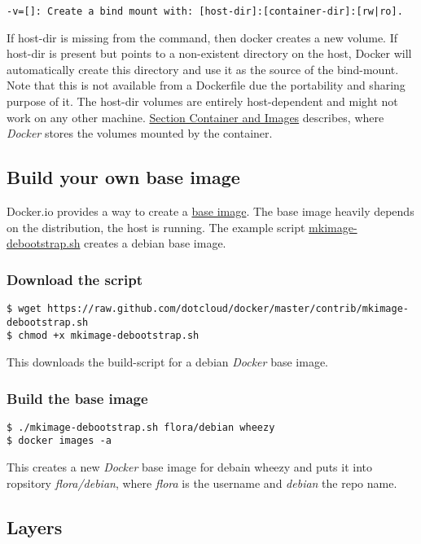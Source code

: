 \documentclass[11pt]{article}
\begin{document}
\begin{verbatim}
-v=[]: Create a bind mount with: [host-dir]:[container-dir]:[rw|ro].
\end{verbatim}
If host-dir is missing from the command, then docker creates a new volume. If host-dir is present but points to a non-existent directory on the host, Docker will automatically create this directory and use it as the source of the bind-mount.
Note that this is not available from a Dockerfile due the portability and sharing purpose of it. The host-dir volumes are entirely host-dependent and might not work on any other machine. \hyperref[sec-2-6]{Section Container and Images} describes, where \emph{Docker} stores the volumes mounted by the container.
\subsection{Build your own base image}
\label{sec-2-4}

Docker.io provides a way to create a \href{http://docs.docker.io/en/latest/articles/baseimages/}{base image}. The base image heavily depends on the distribution, the host is running. The example script \href{https://github.com/dotcloud/docker/blob/master/contrib/mkimage-debootstrap.sh}{mkimage-debootstrap.sh} creates a debian base image.
\subsubsection{Download the script}
\label{sec-2-4-1}


\begin{verbatim}
$ wget https://raw.github.com/dotcloud/docker/master/contrib/mkimage-debootstrap.sh
$ chmod +x mkimage-debootstrap.sh
\end{verbatim}
This downloads the build-script for a debian \emph{Docker} base image.
\subsubsection{Build the base image}
\label{sec-2-4-2}


\begin{verbatim}
$ ./mkimage-debootstrap.sh flora/debian wheezy 
$ docker images -a
\end{verbatim}
This creates a new \emph{Docker} base image for debain wheezy and puts it into ropsitory \emph{flora/debian}, where \emph{flora} is the username and \emph{debian} the repo name.
\subsection{Layers}
\label{sec-2-5}
\end{document}
